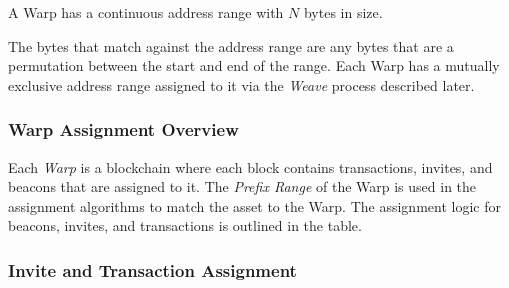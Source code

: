 \documentclass{article}
\begin{document}
A Warp has a continuous address range with $N$ bytes in size.

\begin{center}
\end{center}

The bytes that match against the address range are any bytes that are a permutation
between the start and end of the range.  Each Warp has a mutually exclusive 
address range assigned to it via the \emph{Weave} process described later.

\subsubsection{Warp Assignment Overview}

Each \emph{Warp} is a blockchain where each block contains transactions, invites,
and beacons that are assigned to it.  The \emph{Prefix Range} of the Warp is used in
the assignment algorithms to match the asset to the Warp.
The assignment logic for beacons, invites, and transactions is outlined in the table.

\begin{center}
\end{center}

\subsubsection{Invite and Transaction Assignment}
\end{document}
